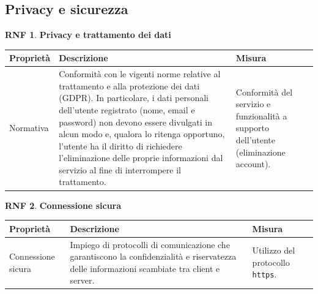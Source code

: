 \documentclass[11pt, a4paper]{article}
\theoremstyle{definition}
\newtheorem{nonfuncreq}{RNF} %
\begin{document}
\subsection{Privacy e sicurezza}

\begin{nonfuncreq}
    \textbf{Privacy e trattamento dei dati }
    \begin{center}
        \footnotesize
        \begin{tabularx}{\textwidth}{|X||X||X|}
            \hline
            \cellcolor{red!70}Proprietà & \cellcolor{red!70}Descrizione & \cellcolor{red!70}Misura\\
            \hline
            Normativa & Conformità con le vigenti norme relative al trattamento e alla protezione dei dati (GDPR). In particolare, i dati personali dell'utente registrato (nome, email e password) non devono essere divulgati in alcun modo e, qualora lo ritenga opportuno, l'utente ha il diritto di richiedere l'eliminazione delle proprie informazioni dal servizio al fine di interrompere il trattamento. & Conformità del servizio e funzionalità a supporto dell'utente (eliminazione account).\\
            \hline
        \end{tabularx}
    \end{center}
\end{nonfuncreq}

\begin{nonfuncreq}
    \textbf{Connessione sicura }
    \begin{center}
        \footnotesize
        \begin{tabularx}{\textwidth}{|X||X||X|}
            \hline
            \cellcolor{red!70}Proprietà & \cellcolor{red!70}Descrizione & \cellcolor{red!70}Misura\\
            \hline
            Connessione sicura & Impiego di protocolli di comunicazione che garantiscono la confidenzialità e riservatezza delle informazioni scambiate tra client e server. & Utilizzo del protocollo \texttt{https}.\\
            \hline
        \end{tabularx}
    \end{center}
\end{nonfuncreq}
\end{document}
